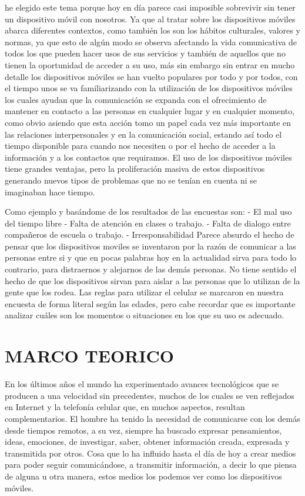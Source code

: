 \documentclass[10pt,a4paper]{article}
\begin{document}
he elegido este tema porque hoy en d{\'i}a parece casi imposible sobrevivir sin tener un dispositivo m{\'o}vil con nosotros. Ya que al tratar sobre los dispositivos m{\'o}viles abarca diferentes contextos, como tambi{\'e}n los son los h{\'a}bitos culturales, valores y normas, ya que esto de alg{\'u}n modo se observa afectando  la vida comunicativa de todos los que pueden hacer usos de sus servicios y  tambi{\'e}n  de aquellos que no tienen la oportunidad de acceder a su uso, m{\'a}s sin embargo sin entrar en mucho  detalle los dispositivos m{\'o}viles se han vuelto  populares por todo y por todos, con el tiempo unos se va familiarizando  con la utilizaci{\'o}n de los dispositivos  m{\'o}viles los cuales ayudan que la comunicaci{\'o}n se expanda con el ofrecimiento de mantener en contacto a las personas en cualquier lugar y en cualquier momento, como obvio asiendo que esta acci{\'o}n tomo un papel  cada vez m{\'a}s importante en las relaciones interpersonales y en la comunicaci{\'o}n social, estando as{\'i} todo el tiempo disponible para cuando nos necesiten o por el hecho de acceder a la informaci{\'o}n y a los contactos que requiramos. El uso de los dispositivos m{\'o}viles tiene grandes ventajas, pero la proliferaci{\'o}n masiva de estos dispositivos generando nuevos tipos de problemas que no se ten{\'i}an en cuenta ni se imaginaban hace tiempo. 

Como ejemplo y bas{\'a}ndome de los resultados de las encuestas son:
-	El mal uso del tiempo libre
-	Falta de atenci{\'o}n en clases o trabajo.
-	Falta de dialogo entre compa{\~n}eros de escuela o trabajo.
-	Irresponsabilidad
Parece absurdo el hecho de pensar que los dispositivos moviles se inventaron por la raz{\'o}n de comunicar a las personas entre si y que en pocas palabras hoy en la actualidad sirva para todo lo contrario, para distraernos y alejarnos de las dem{\'a}s personas.
No tiene sentido el hecho de que los dispositivos sirvan para aislar a las personas que lo utilizan de la gente que los rodea.
Las reglas para utilizar el celular se marcaron en nuestra encuesta de forma literal seg{\'u}n las edades, pero cabe recordar que es importante analizar cu{\'a}les son los momentos o situaciones en los que su uso es adecuado.

	\section{MARCO TEORICO}
	
	En los {\'u}ltimos a{\~n}os el mundo ha experimentado avances tecnol{\'o}gicos que se producen a una velocidad sin precedentes, muchos de los cuales se ven reflejados en Internet y la telefon{\'i}a celular que, en muchos aspectos, resultan complementarios. 
El hombre ha tenido la necesidad de comunicarse con los dem{\'a}s desde tiempos remotos, a su vez, siempre ha buscado expresar pensamientos, ideas, emociones, de investigar, saber, obtener informaci{\'o}n creada, expresada y transmitida por otros. Cosa que lo ha influido hasta el d{\'i}a de hoy a crear medios para poder seguir comunic{\'a}ndose, a transmitir informaci{\'o}n, a decir lo que piensa de alguna u otra manera, estos medios los podemos ver como los dispositivos m{\'o}viles. 
\end{document}
